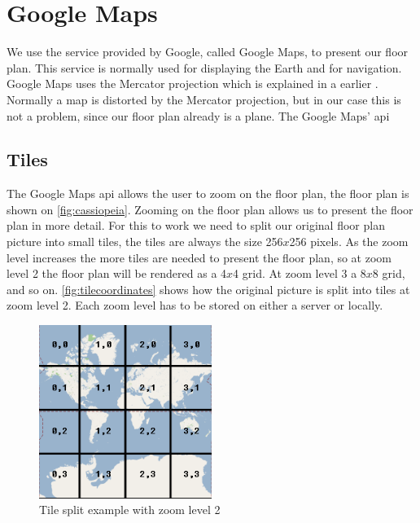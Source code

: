 \section{Google Maps}
 We use the service provided by Google, called Google Maps, to present our floor plan. This service is normally used for displaying the Earth and for navigation. Google Maps uses the Mercator projection which is explained in a earlier . Normally a map is distorted by the Mercator projection, but in our case this is not a problem, since our floor plan already is a plane. The Google Maps' \ac{api}  
\subsection*{Tiles}
The Google Maps \ac{api} allows the user to zoom on the floor plan, the floor plan is shown on \autoref{fig:cassiopeia}. Zooming on the floor plan allows us to present the floor plan in more detail. For this to work we need to split our original floor plan picture into small tiles, the tiles are always the size 256$x$256 pixels. As the zoom level increases the more tiles are needed to present the floor plan, so at zoom level 2 the floor plan will be rendered as  a 4$x$4 grid. At zoom level 3 a 8$x$8 grid, and so on. \autoref{fig:tilecoordinates} shows how the original picture is split into tiles at zoom level 2. Each zoom level has to be stored on either a server or locally.

\begin{figure}[H]
\centering
\includegraphics[width=0.5\textwidth]{img/tilecoordinates.png}
\caption{Tile split example with zoom level 2 \citep{tilecoordinates}}
\label{fig:tilecoordinates}
\end{figure}

